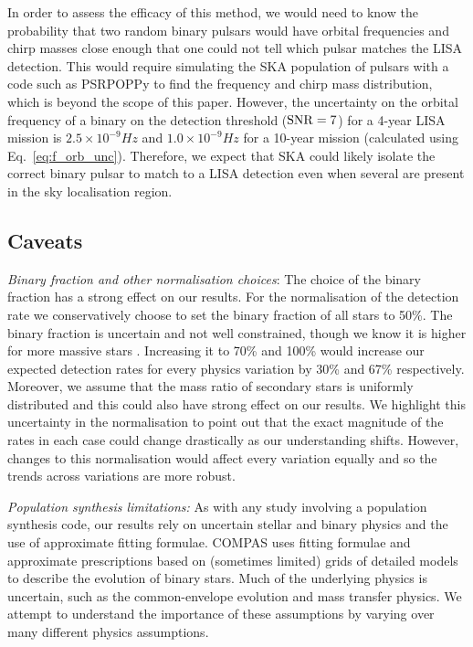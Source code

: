 In order to assess the efficacy of this method, we would need to know the probability that two random binary pulsars would have orbital frequencies and chirp masses close enough that one could not tell which pulsar matches the LISA detection. This would require simulating the SKA population of pulsars with a code such as PSRPOPPy \citep{Bates+2014} to find the frequency and chirp mass distribution, which is beyond the scope of this paper. However, the uncertainty on the orbital frequency of a binary on the detection threshold (${\rm SNR} = 7$) for a 4-year LISA mission is $2.5 \times 10^{-9} \unit{Hz}$ and $1.0 \times 10^{-9} \unit{Hz}$ for a 10-year mission (calculated using Eq.~\ref{eq:f_orb_unc}). Therefore, we expect that SKA could likely isolate the correct binary pulsar to match to a LISA detection even when several are present in the sky localisation region.

\subsection{Caveats}\label{sec:caveats}
\textit{Binary fraction and other normalisation choices}: The choice of the binary fraction has a strong effect on our results. For the normalisation of the detection rate we conservatively choose to set the binary fraction of all stars to 50\%. The binary fraction is uncertain and not well constrained, though we know it is higher for more massive stars \citep[e.g.][]{Sana+2012}. Increasing it to 70\% and 100\% would increase our expected detection rates for every physics variation by 30\% and 67\% respectively. Moreover, we assume that the mass ratio of secondary stars is uniformly distributed and this could also have strong effect on our results. We highlight this uncertainty in the normalisation to point out that the exact magnitude of the rates in each case could change drastically as our understanding shifts. However, changes to this normalisation would affect every variation equally and so the trends across variations are more robust.

\textit{Population synthesis limitations:} As with any study involving a population synthesis code, our results rely on uncertain stellar and binary physics and the use of approximate fitting formulae. COMPAS uses fitting formulae and approximate prescriptions based on (sometimes limited) grids of detailed models to describe the evolution of binary stars. Much of the underlying physics is uncertain, such as the common-envelope evolution and mass transfer physics. We attempt to understand the importance of these assumptions by varying over many different physics assumptions.

